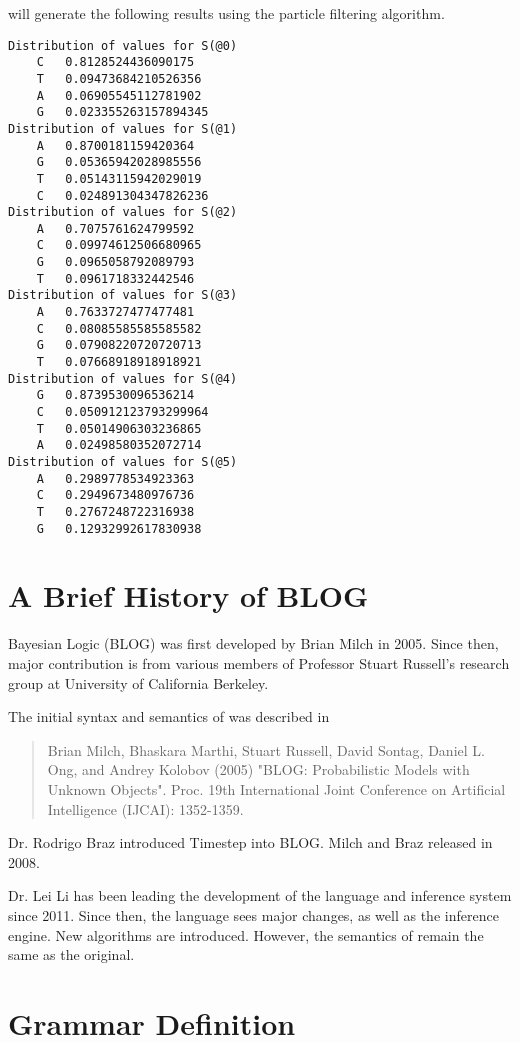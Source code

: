 \bl will generate the following results using the particle filtering algorithm. 
\begin{verbatim}
Distribution of values for S(@0)
	C	0.8128524436090175
	T	0.09473684210526356
	A	0.06905545112781902
	G	0.023355263157894345
Distribution of values for S(@1)
	A	0.8700181159420364
	G	0.05365942028985556
	T	0.05143115942029019
	C	0.024891304347826236
Distribution of values for S(@2)
	A	0.7075761624799592
	C	0.09974612506680965
	G	0.0965058792089793
	T	0.0961718332442546
Distribution of values for S(@3)
	A	0.7633727477477481
	C	0.08085585585585582
	G	0.07908220720720713
	T	0.07668918918918921
Distribution of values for S(@4)
	G	0.8739530096536214
	C	0.050912123793299964
	T	0.05014906303236865
	A	0.02498580352072714
Distribution of values for S(@5)
	A	0.2989778534923363
	C	0.2949673480976736
	T	0.2767248722316938
	G	0.12932992617830938
\end{verbatim}

\appendix

{}


\section{A Brief  History of BLOG}\label{history-appendix}
Bayesian Logic (BLOG) was first developed by Brian Milch in 2005. Since then, major contribution is from various members of Professor Stuart Russell's research group at University of California Berkeley. 

The initial syntax and semantics of \bl was described in 

\begin{quote}
Brian Milch, Bhaskara Marthi, Stuart Russell, David Sontag, Daniel L. Ong, and Andrey Kolobov (2005) "BLOG: Probabilistic Models with Unknown Objects". Proc. 19th International Joint Conference on Artificial Intelligence (IJCAI): 1352-1359.
\end{quote}

Dr. Rodrigo Braz introduced Timestep into BLOG. Milch and Braz released  in 2008.

Dr. Lei Li has been leading the development of the language and \bl inference system since 2011. Since then, the language sees major changes, as well as the inference engine. New algorithms are introduced. However, the semantics of \bl remain the same as the original. 

\section{\bl Grammar Definition}\label{bnf-appendix}


